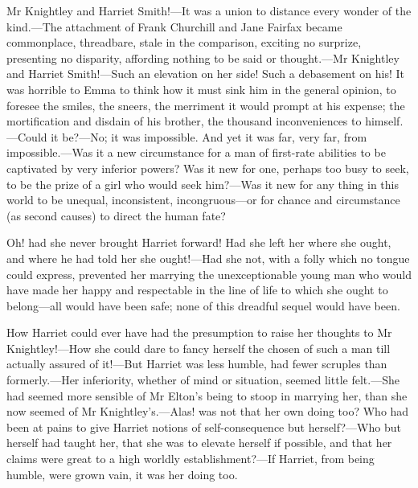 Mr Knightley and Harriet Smith!—It was a union to distance every wonder of the kind.—The attachment of Frank Churchill and Jane Fairfax became commonplace, threadbare, stale in the comparison, exciting no surprize, presenting no disparity, affording nothing to be said or thought.—Mr Knightley and Harriet Smith!—Such an elevation on her side! Such a debasement on his! It was horrible to Emma to think how it must sink him in the general opinion, to foresee the smiles, the sneers, the merriment it would prompt at his expense; the mortification and disdain of his brother, the thousand inconveniences to himself.—Could it be?—No; it was impossible. And yet it was far, very far, from impossible.—Was it a new circumstance for a man of first-rate abilities to be captivated by very inferior powers? Was it new for one, perhaps too busy to seek, to be the prize of a girl who would seek him?—Was it new for any thing in this world to be unequal, inconsistent, incongruous—or for chance and circumstance (as second causes) to direct the human fate?

Oh! had she never brought Harriet forward! Had she left her where she ought, and where he had told her she ought!—Had she not, with a folly which no tongue could express, prevented her marrying the unexceptionable young man who would have made her happy and respectable in the line of life to which she ought to belong—all would have been safe; none of this dreadful sequel would have been.

How Harriet could ever have had the presumption to raise her thoughts to Mr Knightley!—How she could dare to fancy herself the chosen of such a man till actually assured of it!—But Harriet was less humble, had fewer scruples than formerly.—Her inferiority, whether of mind or situation, seemed little felt.—She had seemed more sensible of Mr Elton's being to stoop in marrying her, than she now seemed of Mr Knightley's.—Alas! was not that her own doing too? Who had been at pains to give Harriet notions of self-consequence but herself?—Who but herself had taught her, that she was to elevate herself if possible, and that her claims were great to a high worldly establishment?—If Harriet, from being humble, were grown vain, it was her doing too.